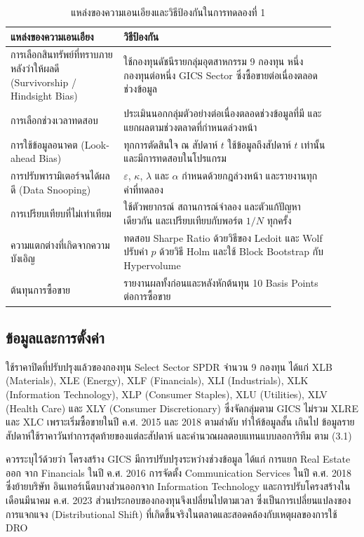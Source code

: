 \begin{table}[htbp]
\centering
\caption{แหล่งของความเอนเอียงและวิธีป้องกันในการทดลองที่ 1}
\label{tab:exp1-bias}
\begin{tabular}{>{\raggedright\arraybackslash}p{0.32\linewidth}>{\raggedright\arraybackslash}p{0.6\linewidth}}
\toprule
แหล่งของความเอนเอียง & วิธีป้องกัน \\
\midrule
การเลือกสินทรัพย์ที่ทราบภายหลังว่าให้ผลดี (Survivorship / Hindsight Bias)
 & ใช้กองทุนดัชนีรายกลุ่มอุตสาหกรรม 9 กองทุน หนึ่งกองทุนต่อหนึ่ง GICS Sector ซึ่งซื้อขายต่อเนื่องตลอดช่วงข้อมูล \\
การเลือกช่วงเวลาทดสอบ
 & ประเมินนอกกลุ่มตัวอย่างต่อเนื่องตลอดช่วงข้อมูลที่มี และแยกผลตามช่วงตลาดที่กำหนดล่วงหน้า \\
การใช้ข้อมูลอนาคต (Look-ahead Bias)
 & ทุกการตัดสินใจ ณ สัปดาห์ $t$ ใช้ข้อมูลถึงสัปดาห์ $t$ เท่านั้น และมีการทดสอบในโปรแกรม \\
การปรับพารามิเตอร์จนได้ผลดี (Data Snooping)
 & $\varepsilon$, $\kappa$, $\lambda$ และ $\alpha$ กำหนดด้วยกฎล่วงหน้า และรายงานทุกค่าที่ทดลอง \\
การเปรียบเทียบที่ไม่เท่าเทียม
 & ใช้ตัวพยากรณ์ สถานการณ์จำลอง และตัวแก้ปัญหาเดียวกัน และเปรียบเทียบกับพอร์ต $1/N$ ทุกครั้ง \\
ความแตกต่างที่เกิดจากความบังเอิญ
 & ทดสอบ Sharpe Ratio ด้วยวิธีของ Ledoit และ Wolf ปรับค่า $p$ ด้วยวิธี Holm และใช้ Block Bootstrap กับ Hypervolume \\
ต้นทุนการซื้อขาย & รายงานผลทั้งก่อนและหลังหักต้นทุน 10 Basis Points ต่อการซื้อขาย \\
\bottomrule
\end{tabular}
\end{table}

\subsection{ข้อมูลและการตั้งค่า}

ใช้ราคาปิดที่ปรับปรุงแล้วของกองทุน Select Sector SPDR จำนวน 9 กองทุน ได้แก่ XLB (Materials),
XLE (Energy), XLF (Financials), XLI (Industrials), XLK (Information Technology), XLP (Consumer
Staples), XLU (Utilities), XLV (Health Care) และ XLY (Consumer Discretionary) ซึ่งจัดกลุ่มตาม
GICS ไม่รวม XLRE และ XLC เพราะเริ่มซื้อขายในปี ค.ศ. 2015 และ 2018 ตามลำดับ ทำให้ข้อมูลสั้น
เกินไป ข้อมูลรายสัปดาห์ใช้ราคาวันทำการสุดท้ายของแต่ละสัปดาห์ และคำนวณผลตอบแทนแบบลอการิทึม
ตาม (3.1)

ควรระบุไว้ด้วยว่า โครงสร้าง GICS มีการปรับปรุงระหว่างช่วงข้อมูล ได้แก่ การแยก Real Estate ออก
จาก Financials ในปี ค.ศ. 2016 การจัดตั้ง Communication Services ในปี ค.ศ. 2018 ซึ่งย้ายบริษัท
อินเทอร์เน็ตบางส่วนออกจาก Information Technology และการปรับโครงสร้างในเดือนมีนาคม ค.ศ. 2023
ส่วนประกอบของกองทุนจึงเปลี่ยนไปตามเวลา ซึ่งเป็นการเปลี่ยนแปลงของการแจกแจง (Distributional
Shift) ที่เกิดขึ้นจริงในตลาดและสอดคล้องกับเหตุผลของการใช้ DRO

